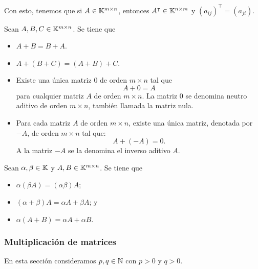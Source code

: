 \documentclass[a4,11pt]{aleph-notas}
\begin{document}
\begin{advertencia}
    Con esto, tenemos que si $A\in \Mat[\K]{m}{n}$, entonces $A^\intercal\in \Mat[\K]{n}{m}$ y $(a_{ij})^\intercal =(a_{ji})$.
\end{advertencia}

\begin{teo}
    Sean $A,B,C\in\Mat[\K]{m}{n}$. Se tiene que
    \begin{itemize}
    \item 
        $A + B = B + A$.
    \item 
        $A + (B+C) = (A + B)+C$.
    \item 
        Existe una única matriz $0$ de orden $m \times n$ tal que 
        \[ 
            A + 0 =  A 
        \]
        para cualquier matriz $A$ de orden $m \times n$. La matriz $0$ se denomina neutro aditivo de orden $m \times n$, también llamada la matriz nula.
    \item 
        Para cada matriz $A$ de orden $m \times n$, existe una única matriz, denotada por $-A$, de orden $m \times n$ tal que:
        \[
            A + (-A) = 0.
        \]
        A la matriz $-A$ se la denomina el inverso aditivo $A$.
    \end{itemize}
\end{teo}

\begin{teo}
    Sean $\alpha,\beta \in \K$ y $A,B\in\Mat[\K]{m}{n}$. Se tiene que
    \begin{itemize}
    \item 
        $\alpha(\beta A) = (\alpha\beta)A$;
    \item 
        $(\alpha+\beta)A = \alpha A + \beta A$; y
    \item 
        $\alpha(A+B) = \alpha A + \alpha B$.
    \end{itemize}
\end{teo}


\subsubsection{Multiplicación de matrices}

En esta sección consideramos  $p,q\in \N$ con $p>0$ y $q>0$.


\end{document}
